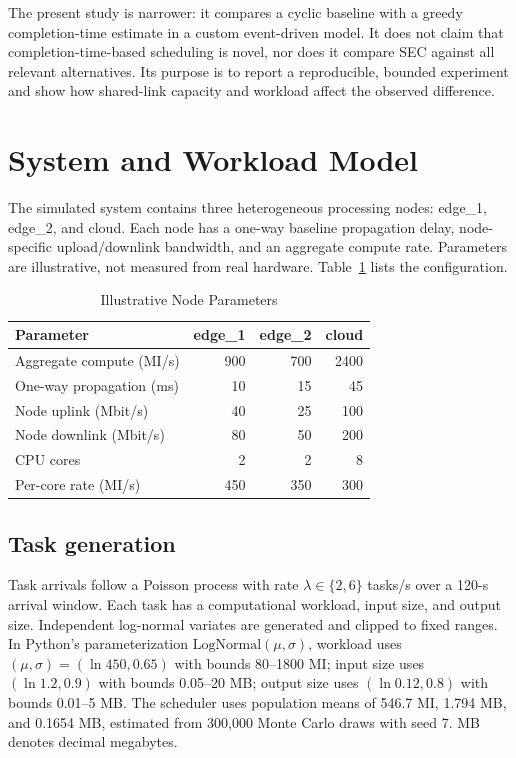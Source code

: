 \documentclass[conference]{IEEEtran}
\begin{document}
The present study is narrower: it compares a cyclic baseline with a greedy completion-time estimate in a custom event-driven model. It does not claim that completion-time-based scheduling is novel, nor does it compare SEC against all relevant alternatives. Its purpose is to report a reproducible, bounded experiment and show how shared-link capacity and workload affect the observed difference.

\section{System and Workload Model}
\label{sec:model}
The simulated system contains three heterogeneous processing nodes: edge\_1, edge\_2, and cloud. Each node has a one-way baseline propagation delay, node-specific upload/downlink bandwidth, and an aggregate compute rate. Parameters are illustrative, not measured from real hardware. Table~\ref{tab:nodes} lists the configuration.

\begin{table}[t]
\caption{Illustrative Node Parameters}
\label{tab:nodes}
\centering
\footnotesize
\begin{tabular}{lrrr}
\toprule
Parameter & edge\_1 & edge\_2 & cloud\\
\midrule
Aggregate compute (MI/s) & 900 & 700 & 2400\\
One-way propagation (ms) & 10 & 15 & 45\\
Node uplink (Mbit/s) & 40 & 25 & 100\\
Node downlink (Mbit/s) & 80 & 50 & 200\\
CPU cores & 2 & 2 & 8\\
Per-core rate (MI/s) & 450 & 350 & 300\\
\bottomrule
\end{tabular}
\end{table}

\subsection{Task generation}
Task arrivals follow a Poisson process with rate $\lambda\in\{2,6\}$ tasks/s over a 120-s arrival window. Each task has a computational workload, input size, and output size. Independent log-normal variates are generated and clipped to fixed ranges. In Python's parameterization $\mathrm{LogNormal}(\mu,\sigma)$, workload uses $(\mu,\sigma)=(\ln 450,0.65)$ with bounds 80--1800 MI; input size uses $(\ln 1.2,0.9)$ with bounds 0.05--20 MB; output size uses $(\ln 0.12,0.8)$ with bounds 0.01--5 MB. The scheduler uses population means of 546.7 MI, 1.794 MB, and 0.1654 MB, estimated from 300,000 Monte Carlo draws with seed 7. MB denotes decimal megabytes.
\end{document}
